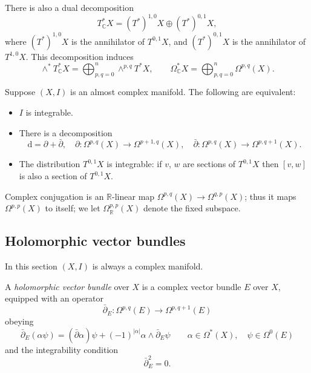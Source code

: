 \documentclass[12pt,letterpaper,reqno]{amsart}
\numberwithin{equation}{section}
\newcommand{\R}{\ensuremath{\mathbb R}}
\newcommand{\C}{\ensuremath{\mathbb C}}
\newcommand{\de}{\mathrm{d}}
\newcommand{\abs}[1]{\lvert#1\rvert}
\newcommand{\ti}[1]{\textit{#1}}
\begin{document}
There is also a dual decomposition
\begin{equation}
T^*_\C X = (T^*)^{1,0} X \oplus (T^*)^{0,1} X,
  \end{equation}
where $(T^*)^{1,0} X$ is the annihilator of
$T^{0,1} X$, and $(T^*)^{0,1} X$ is the annihilator of
$T^{1,0} X$.
This decomposition induces
\begin{equation}
\wedge^* T^*_\C X = \bigoplus_{p,q=0}^n \wedge^{p,q} T^* X , \qquad \Omega^*_\C X = \bigoplus_{p,q=0}^n \Omega^{p,q}(X).
\end{equation}

\begin{prop}
Suppose $(X,I)$ is an almost complex manifold. The following are equivalent:
\begin{itemize}
\item $I$ is integrable.
\item There is a decomposition
\begin{equation}
\de = \partial + \bar\partial, \quad \partial: \Omega^{p,q}(X) \to \Omega^{p+1,q}(X), \quad \bar\partial: \Omega^{p,q}(X) \to \Omega^{p,q+1}(X).
\end{equation}
\item The distribution $T^{0,1}X$ is integrable: if $v$, $w$ are 
sections of $T^{0,1}X$ then $[v,w]$ is also a section of $T^{0,1}X$.
\end{itemize}
\end{prop}

Complex conjugation is an $\R$-linear map
$\Omega^{p,q}(X) \to \Omega^{q,p}(X)$;
thus it maps $\Omega^{p,p}(X)$ to itself;
we let $\Omega_\R^{p,p}(X)$ denote the fixed subspace.

\subsection{Holomorphic vector bundles}

In this section $(X,I)$ is always a complex manifold.

\begin{defn} A \ti{holomorphic vector bundle} over $X$ is a complex vector bundle $E$ over $X$, equipped with an operator
\begin{equation}
  \bar\partial_E :  \Omega^{p,q}(E) \to \Omega^{p,q+1}(E)
\end{equation}
obeying
\begin{equation}
  \bar\partial_E (\alpha \psi) = (\bar\partial \alpha) \psi + (-1)^{\abs{\alpha}} \alpha \wedge \bar\partial_E \psi \qquad \alpha \in \Omega^*(X), \quad \psi \in \Omega^0(E)
\end{equation}
and the integrability condition
\begin{equation}
  \bar\partial_E^2 = 0.
\end{equation}
\end{defn}
\end{document}
